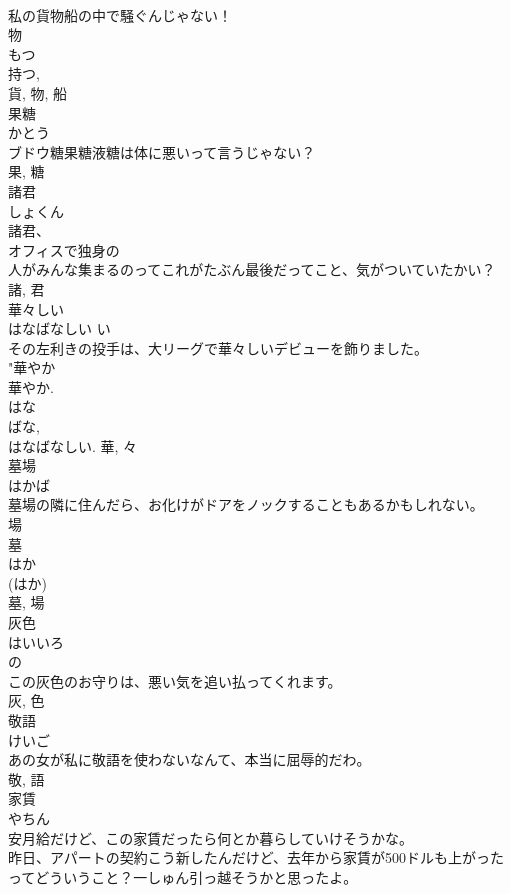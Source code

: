 \documentclass[8pt]{extreport}
\begin{document}
\begin{CJK}{UTF8}{min}
\\	私の貨物船の中で騒ぐんじゃない！	
\\	物 
\\	もつ 
\\	持つ, 
\\	貨, 物, 船	
\\	果糖	
\\	かとう	
\\	ブドウ糖果糖液糖は体に悪いって言うじゃない？	
\\	果, 糖	
\\	諸君	
\\	しょくん	
\\	諸君、
\\	オフィスで独身の 
\\	人がみんな集まるのってこれがたぶん最後だってこと、気がついていたかい？	
\\	諸, 君	
\\	華々しい	
\\	はなばなしい	い 
\\	その左利きの投手は、大リーグで華々しいデビューを飾りました。	
\\	"華やか 
\\	華やか. 
\\	はな 
\\	ばな, 
\\	はなばなしい.	華, 々	
\\	墓場	
\\	はかば	
\\	墓場の隣に住んだら、お化けがドアをノックすることもあるかもしれない。	
\\	場 
\\	墓 
\\	はか 
\\	(はか) 
\\	墓, 場	
\\	灰色	
\\	はいいろ	
\\	の 
\\	この灰色のお守りは、悪い気を追い払ってくれます。	
\\	灰, 色	
\\	敬語	
\\	けいご	
\\	あの女が私に敬語を使わないなんて、本当に屈辱的だわ。	
\\	敬, 語	
\\	家賃	
\\	やちん	
\\	安月給だけど、この家賃だったら何とか暮らしていけそうかな。	
\\	昨日、アパートの契約こう新したんだけど、去年から家賃が500ドルも上がったってどういうこと？一しゅん引っ越そうかと思ったよ。	

\end{CJK}
\end{document}
